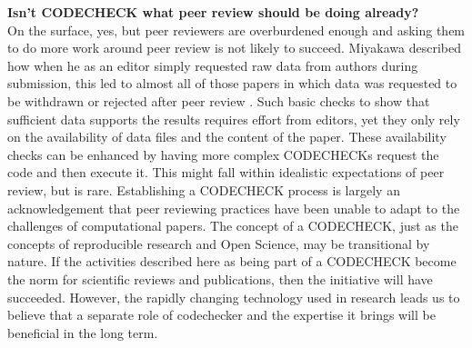 \documentclass[12pt]{article}
\begin{document}
\textbf{Isn't CODECHECK what peer review should be doing already?} \\
On the surface, yes, but peer reviewers are overburdened enough and
asking them to do more work around peer review is not likely to
succeed.  Miyakawa described how when he as an editor simply requested
raw data from authors during submission, this led to almost all of
those papers in which data was requested to be withdrawn or rejected
after peer review \cite{miyakawa_no_2020}.  Such basic checks to show
that sufficient data supports the results requires effort from
editors, yet they only rely on the availability of data files and the
content of the paper.  These availability checks can be enhanced by
having more complex CODECHECKs request the code and then execute it.
This might fall within idealistic expectations of peer review, but is
rare.  Establishing a CODECHECK process is largely an acknowledgement
that peer reviewing practices have been unable to adapt to the
challenges of computational papers.  The concept of a CODECHECK, just
as the concepts of reproducible research and Open Science, may be
transitional by nature. If the activities described here as being part
of a CODECHECK become the norm for scientific reviews and
publications, then the initiative will have succeeded. However, the
rapidly changing technology used in research leads us to believe that
a separate role of codechecker and the expertise it brings will be
beneficial in the long term.

\newpage
\end{document}
